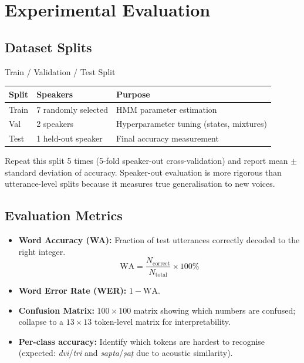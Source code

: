 \documentclass[12pt,a4paper]{article}
\begin{document}
\section{Experimental Evaluation}

\subsection{Dataset Splits}

\begin{keybox}{Train / Validation / Test Split}
\begin{tabular}{lll}
\textbf{Split} & \textbf{Speakers} & \textbf{Purpose} \\
\hline
Train   & 7 randomly selected & HMM parameter estimation \\
Val     & 2 speakers & Hyperparameter tuning (states, mixtures) \\
Test    & 1 held-out speaker & Final accuracy measurement \\
\end{tabular}
\vspace{4pt}

Repeat this split 5 times (5-fold speaker-out cross-validation) and report
mean $\pm$ standard deviation of accuracy.
Speaker-out evaluation is more rigorous than utterance-level splits because
it measures true generalisation to new voices.
\end{keybox}

\subsection{Evaluation Metrics}

\begin{itemize}[leftmargin=1.5em, itemsep=3pt]
  \item \textbf{Word Accuracy (WA):} Fraction of test utterances correctly
        decoded to the right integer.
        \[
          \text{WA} = \frac{N_{\text{correct}}}{N_{\text{total}}} \times 100\%
        \]
  \item \textbf{Word Error Rate (WER):} $1 - \text{WA}$.
  \item \textbf{Confusion Matrix:} $100 \times 100$ matrix showing which
        numbers are confused; collapse to a $13 \times 13$ token-level matrix
        for interpretability.
  \item \textbf{Per-class accuracy:} Identify which tokens are hardest to
        recognise (expected: \textit{dvi}/\textit{tri} and
        \textit{sapta}/\textit{\d{s}a\d{t}} due to acoustic similarity).
\end{itemize}
\end{document}

